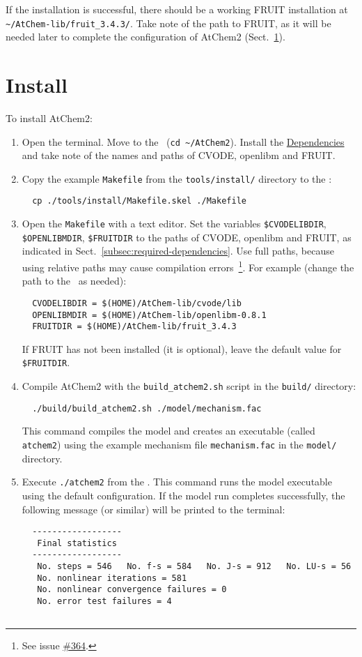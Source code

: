 If the installation is successful, there should be a working FRUIT
installation at \texttt{\textasciitilde/AtChem-lib/fruit\_3.4.3/}.
Take note of the path to FRUIT, as it will be needed later to complete
the configuration of AtChem2 (Sect.~\ref{sec:install}).


\section{Install} \label{sec:install}

To install AtChem2:

\begin{enumerate}
\item Open the terminal. Move to the \maindir\ (\verb|cd ~/AtChem2|).
  Install the \hyperref[sec:dependencies]{Dependencies} and take note
  of the names and paths of CVODE, openlibm and FRUIT.
\item Copy the example \texttt{Makefile} from the
  \texttt{tools/install/} directory to the \maindir:
  \begin{verbatim}
  cp ./tools/install/Makefile.skel ./Makefile
  \end{verbatim}
\item Open the \texttt{Makefile} with a text editor. Set the variables
  \texttt{\$CVODELIBDIR}, \texttt{\$OPENLIBMDIR}, \texttt{\$FRUITDIR} to
  the paths of CVODE, openlibm and FRUIT, as indicated in
  Sect.~\ref{subsec:required-dependencies}. Use full paths, because
  using relative paths may cause compilation errors~\footnote{See
    issue \href{https://github.com/AtChem/AtChem2/issues/364}{\#364}.}.
  For example (change the path to the \depdir\ as needed):
  \begin{verbatim}
  CVODELIBDIR = $(HOME)/AtChem-lib/cvode/lib
  OPENLIBMDIR = $(HOME)/AtChem-lib/openlibm-0.8.1
  FRUITDIR = $(HOME)/AtChem-lib/fruit_3.4.3
  \end{verbatim}
  If FRUIT has not been installed (it is optional), leave the default
  value for \texttt{\$FRUITDIR}.
\item Compile AtChem2 with the \texttt{build\_atchem2.sh} script in
  the \texttt{build/} directory:
  \begin{verbatim}
  ./build/build_atchem2.sh ./model/mechanism.fac
  \end{verbatim}
  This command compiles the model and creates an executable (called
  \texttt{atchem2}) using the example mechanism file \texttt{mechanism.fac} in
  the \texttt{model/} directory.
\item Execute \verb|./atchem2| from the \maindir. This command runs
  the model executable using the default configuration. If the model
  run completes successfully, the following message (or similar) will
  be printed to the terminal:
  \begin{verbatim}
  ------------------
   Final statistics
  ------------------
   No. steps = 546   No. f-s = 584   No. J-s = 912   No. LU-s = 56
   No. nonlinear iterations = 581
   No. nonlinear convergence failures = 0
   No. error test failures = 4


\end{verbatim}
\end{enumerate}
